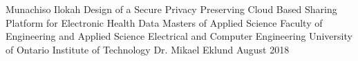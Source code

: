 

\usepackage{hyperref}
\hypersetup{
    colorlinks,
    citecolor=black,
    filecolor=black,
    linkcolor=black,
    urlcolor=black
}



\thesisTitle
  {Munachiso Ilokah}
  {Design of a Secure Privacy Preserving Cloud Based Sharing Platform for Electronic Health Data}
  {Masters of Applied Science}
  {Faculty of Engineering and Applied Science}
  {Electrical and Computer Engineering}
  {University of Ontario Institute of Technology}
  {Dr. Mikael Eklund}
  {August}
  {2018}




\singlespacing
\tableofcontents
\listoffigures
\listoftables
\printglossary[style=list]
\clearpage
\doublespacing






%
%










%


